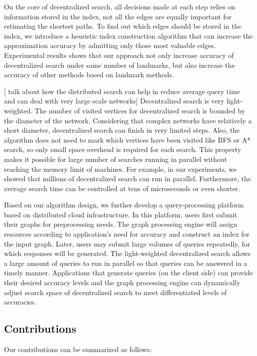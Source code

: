 On the core of decentralized search, all decisions made at each step relies on information stored in the index, not all the edges are equally important for estimating the shortest paths. To find out which edges should be stored in the index, we introduce a heuristic index construction algorithm that can increase the approximation accuracy by admitting only those most valuable edges. Experimental results shows that our approach not only increase accuracy of decentralized search under same number of landmarks, but also increase the accuracy of other methods based on landmark methods.

[ talk about how the distributed search can help in reduce average query time and can deal with very large scale networks]
Decentralized search is very light-weighted. The number of visited vertices for decentralized search is bounded by the diameter of the network. Considering that complex networks have relatively a short diameter, decentralized search can finish in very limited steps. Also, the algorithm does not need to mark which vertices have been visited like BFS or A* search, so only small space overhead is required for each search. This property makes it possible for large number of searches running in parallel without reaching the memory limit of machines. For example, in our experiments, we showed that millions of decentralized search can run in parallel. Furthermore, the average search time can be controlled at tens of microseconds or even shorter. 

Based on our algorithm design, we further develop a query-processing platform based on distributed cloud infrastructure. In this platform, users first submit their graphs for preprocessing needs. The graph processing engine will assign resources according to application's need for accuracy and construct an index for the input graph. Later, users may submit large volumes of queries repeatedly, for which responses will be generated. The light-weighted decentralized search allows a large amount of queries to run in parallel so that queries can be answered in a timely manner. Applications that generate queries (on the client side) can provide their desired accuracy levels and the graph processing engine can dynamically adjust search space of decentralized search to meet differentiated levels of accuracies.


\subsection{Contributions}
Our contributions can be summarized as follows:

